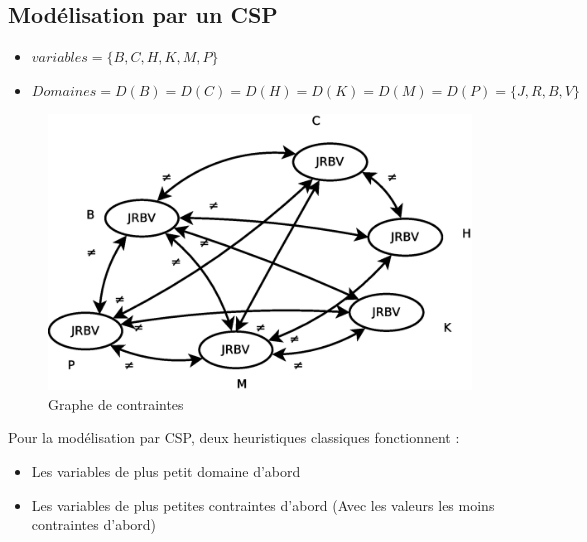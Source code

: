 \documentclass[12pt,a4paper,openany]{book}
\begin{document}
	\subsection{Modélisation par un CSP}
	\begin{itemize}
		\item $variables = \{ B, C, H, K, M, P\}$
		\item $Domaines = D(B) = D(C) = D(H) = D(K) = D(M) = D(P) = \{ J, R, B, V\}$
	\end{itemize}
	 \begin{figure}[H]
		 \centering
		 \includegraphics[width=14cm]{Diagramme14.eps}
		 \caption{Graphe de contraintes}
	 \end{figure}

	Pour la modélisation par CSP, deux heuristiques classiques fonctionnent : 
	\begin{itemize}
		\item Les variables de plus petit domaine d'abord
		\item Les variables de plus petites contraintes d'abord (Avec les valeurs les moins contraintes d'abord)
	\end{itemize}
\end{document}
